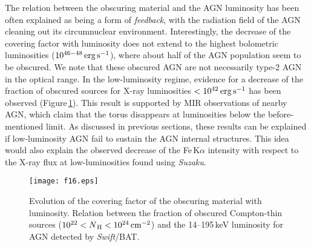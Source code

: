 \documentclass{natureprintstyle}
\begin{document}
%








The relation between the obscuring material and the AGN luminosity has been often explained as being a form of {\it feedback}, with the radiation field of the AGN 
cleaning out its circumnuclear environment\cite{Fabian:2006sp}. 
Interestingly, the decrease of the covering factor with luminosity does not extend to the highest bolometric luminosities ($10^{46-48}\rm\,erg\,s^{-1}$), 
where about half of the AGN population seem to be obscured\cite{Assef:2015ly}. We note that these obscured AGN are not necessarily type-2 AGN in the optical range.
In the low-luminosity regime, evidence for a decrease of the fraction of obscured sources for X-ray luminosities $<10^{42}\rm\,erg\,s^{-1}$ has been 
observed\cite{Burlon:2011dk} (Figure\,\ref{fig:fobs_L}). This result is supported by MIR observations of nearby AGN, which claim that the torus disappears 
at luminosities below the before-mentioned limit\cite{Gonzalez15}. As discussed in previous sections, these results can be explained if low-luminosity AGN 
fail to sustain the AGN internal structures\cite{Elitzur:2006ec}. {This idea would also explain the observed decrease of the Fe\,K$\alpha$ intensity with 
respect to the X-ray flux at low-luminosities found using {\it Suzaku}\cite{Kawamuro:2016lq}.} 

\begin{figure}[t!]
\texttt{[image: f16.eps]}
%
%
  \caption{{Evolution of the covering factor of the obscuring material with luminosity.} Relation between the fraction of obscured Compton-thin sources ($10^{22}<N_{\rm\,H}<10^{24}\rm\,cm^{-2}$) and the 14--195\,keV luminosity for AGN detected by {\it Swift}/BAT\cite{Burlon:2011dk}.  
    }
\label{fig:fobs_L}
\end{figure}
\end{document}
